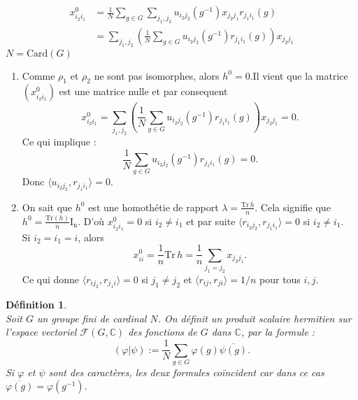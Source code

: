 \documentclass[a4paper, 14pt]{report}
\newtheorem{definition}{Définition}[section]
\begin{document}
\begin{onehalfspace}
{			\[
			\begin{aligned}
				x^0_{i_2 i_1} &= \frac{1}{N} \sum_{g \in G} \sum_{j_1,j_2} u_{i_2 j_2}(g^{-1}) x_{j_2 j_1} r_{j_1 i_1}(g) \\
				&= \sum_{j_1,j_2} \left( \frac{1}{N} \sum_{g \in G} u_{i_2 j_2}(g^{-1}) r_{j_1 i_1}(g) \right) x_{j_2 j_1}
			\end{aligned}
			\]
			\( N = \mathrm{Card}(G) \) 
			
			\begin{enumerate}[label=\roman*)]
				\item Comme  \( \rho_1 \) et \( \rho_2 \) ne sont pas isomorphes, alors \( h^0 = 0 \).Il vient que la matrice $(x^0_{i_2i_1})$ est une matrice nulle et par consequent  
				\[
				x^0_{i_2 i_1} =\sum_{j_1,j_2} \left( \frac{1}{N} \sum_{g \in G} u_{i_2 j_2}(g^{-1}) r_{j_1 i_1}(g) \right) x_{j_2 j_1} =0.
				\]
				Ce qui implique :
				\[
				\frac{1}{N} \sum_{g \in G} u_{i_2j_2}(g^{-1}) r_{j_1i_1}(g) = 0.
				\]
				Donc $\langle u_{i_2j_2}, r_{j_1i_1} \rangle = 0$.\\
				
				\item On sait que $h^0$ est une homothétie de rapport $\lambda = \frac{\mathrm{Tr}\,h}{n}$. Cela signifie que  \( h^0 = \frac{\text{Tr}(h)}{n} \mathrm{I_n} \). D’où $x^0_{i_2i_1} = 0$ si $i_2 \neq i_1$ et par suite
				$\langle r_{i_2j_2}, r_{j_1i_1} \rangle = 0$ si $i_2 \neq i_1$. \\
				Si $i_2 = i_1 = i$, alors
				\[
				x^0_{ii} = \frac{1}{n} \mathrm{Tr}\,h = \frac{1}{n} \sum_{j_1=j_2} x_{j_2j_1}.
				\]
				Ce qui donne $\langle r_{ij_2}, r_{j_1i} \rangle = 0$ si $j_1 \neq j_2$ et 
				$\langle r_{ij}, r_{ji} \rangle = 1/n$ pour tous $i, j$.
				
			\end{enumerate}
			
			
			\begin{definition} \cite{serre1971representation}\\
				Soit $G$ un groupe fini de cardinal $N$. On définit un produit scalaire hermitien sur l’espace vectoriel $\mathscr{F}(G, \mathbb{C})$ des fonctions de $G$ dans $\mathbb{C}$, par la formule :
				\[
				(\varphi | \psi) := \frac{1}{N} \sum_{g \in G} \varphi(g) \overline{\psi(g)}.
				\]
				Si $\varphi$ et $\psi$ sont des caractères, les deux formules 
				coïncident car dans ce cas $\overline{\varphi(g)} = \varphi(g^{-1})$.
			\end{definition}
			
}
\end{onehalfspace}
\end{document}
